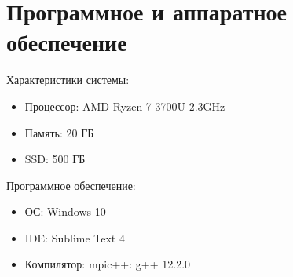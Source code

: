 \section{Программное и аппаратное обеспечение}
Характеристики системы:
\begin{itemize}[noitemsep, topsep=0pt]
	\item Процессор: AMD Ryzen 7 3700U \@ 2.3GHz
	\item Память: 20 ГБ
	\item SSD: 500 ГБ
\end{itemize}

Программное обеспечение:
\begin{itemize}[noitemsep, topsep=0pt]
	\item ОС: Windows 10
	\item IDE: Sublime Text 4
	\item Компилятор: mpic++: g++ 12.2.0
\end{itemize}